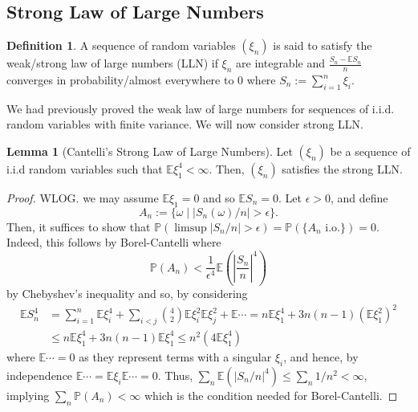 \documentclass[]{article}
\theoremstyle{definition}
\theoremstyle{definition}
\newtheorem{definition}{Definition}[section]
\newtheorem{lemma}{Lemma}[section]
\begin{document}
\subsection{Strong Law of Large Numbers}

\begin{definition}
  A sequence of random variables \((\xi_n)\) is said to satisfy the weak/strong 
  law of large numbers (LLN) if \(\xi_n\) are integrable and 
  \(\frac{S_n - \mathbb{E}S_n}{n}\) converges in probability/almost everywhere 
  to 0 where \(S_n := \sum_{i = 1}^n \xi_i\).
\end{definition}

We had previously proved the weak law of large numbers for sequences of 
i.i.d. random variables with finite variance. We will now consider strong 
LLN.

\begin{lemma}[Cantelli's Strong Law of Large Numbers]
  Let \((\xi_n)\) be a sequence of i.i.d random variables such that 
  \(\mathbb{E}\xi_1^4 < \infty\). Then, \((\xi_n)\) satisfies the strong LLN.
\end{lemma}
\begin{proof}
  WLOG. we may assume \(\mathbb{E}\xi_1 = 0\) and so \(\mathbb{E}S_n = 0\).
  Let \(\epsilon > 0\), and define 
  \[A_n := \{\omega \mid |S_n(\omega)/n| > \epsilon\}.\]
  Then, it suffices to show that \(\mathbb{P}(\limsup |S_n / n| > \epsilon) = 
  \mathbb{P}(\{A_n \text{ i.o.}\}) = 0\). Indeed, this follows by 
  Borel-Cantelli where 
  \[\mathbb{P}(A_n) < \frac{1}{\epsilon^4} \mathbb{E}\left(\left|\frac{S_n}{n}\right|^4\right)\]
  by Chebyshev's inequality and so, by considering
  \[\begin{split}
    \mathbb{E}S_n^4 & = \sum_{i = 1}^n \mathbb{E}\xi_i^4 + 
    \sum_{i < j} {4 \choose 2} \mathbb{E}\xi_i^2 \mathbb{E}\xi_j^2 + \mathbb{E}\cdots
    = n \mathbb{E}\xi_1^4 + 3n(n - 1)(\mathbb{E}\xi_1^2)^2 \\
    & \le n\mathbb{E}\xi_1^4 + 3n(n - 1) \mathbb{E}\xi_1^4 
    \le n^2 (4\mathbb{E}\xi_1^4)
  \end{split}\]
  where \(\mathbb{E}\cdots = 0\) as they represent terms with a singular \(\xi_i\), 
  and hence, by independence \(\mathbb{E} \cdots = \mathbb{E}\xi_i \mathbb{E}\cdots = 0\).
  Thus, \(\sum_n \mathbb{E}(|S_n / n|^4) \le \sum_n 1 / n^2 < \infty\), implying 
  \(\sum_n \mathbb{P}(A_n) < \infty\) which is the condition needed for Borel-Cantelli.
\end{proof}
\end{document}

